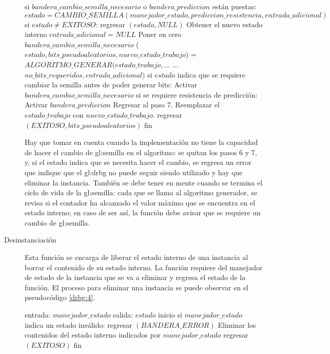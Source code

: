 \begin{description}
\begin{pseudocodigo}[caption={DRBG, generación.}, label={drbg:3}]
    si $bandera\_cambio\_semilla\_necesario$ o $bandera\_prediccion$ están puestas:
      $estado = CAMBIO\_SEMILLA(manejador\_estado, prediccion\_resistencia, entrada\_adicional)$
      si $estado \neq EXITOSO$:
        regresar $(estado, NULL)$
      Obtener el nuevo estado interno
      $entrada\_adicional = NULL$
      Poner en cero $bandera\_cambio\_semilla\_necesario$
    ($estado, bits\_pseudoaleatorios, nuevo\_estado\_trabajo$) = $ALGORITMO\_GENERAR(estado\_trabajo,$...
      ...$no\_bits\_requeridos, entrada\_adicional)$
    si $estado$ indica que se requiere cambiar la semilla antes de poder generar bits:
      Activar $bandera\_cambio\_semilla\_necesario$
      si se requiere resistencia de predicción:
        Activar $bandera\_prediccion$
      Regresar al paso 7.
    Reemplazar el $estado\_trabajo$ con $nuevo\_estado\_trabajo$.
    regresar $(EXITOSO, bits\_pseudoaleatorios)$
  fin
\end{pseudocodigo}
    Hay que tomar en cuenta cuando la implementación no tiene la capacidad de
    hacer el cambio de \gls{gl:semilla} en el algoritmo: se quitan los pasos 6 y
    7, y, si el estado indica que se necesita hacer el cambio, se regresa un
    error que indique que el \gls{gl:drbg} no puede seguir siendo utilizado y
    hay que eliminar la instancia. También se debe tener en mente cuando se
    termina el ciclo de vida de la \gls{gl:semilla}: cada que se llama al
    algoritmo generador, se revisa si el contador ha alcanzado el valor máximo
    que se encuentra en el estado interno; en caso de ser así, la función debe
    avisar que se requiere un cambio de \gls{gl:semilla}.

  \item [Desinstanciación] Esta función se encarga de liberar el estado interno
    de una instancia al borrar el contenido de su estado interno. La función
    requiere del manejador de estado de la instancia que se va a eliminar y
    regresa el estado de la función. El proceso para eliminar una instancia se
    puede observar en el pseudocódigo \ref{drbg:4}.

\begin{pseudocodigo}[caption={DRBG, desinstanciación.}, label={drbg:4}]
  entrada:  $manejador\_estado$
  salida:   $estado$
  inicio
    si $manejador\_estado$ indica un estado inválido:
      regresar $(BANDERA\_ERROR)$
    Eliminar los contenidos del estado interno indicados por $manejador\_estado$
    regresar $(EXITOSO)$
  fin
\end{pseudocodigo}

\end{description}

